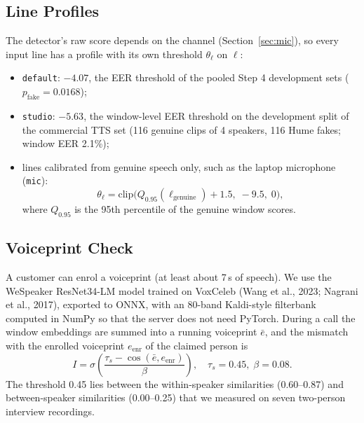 \documentclass[10pt,a4paper,twocolumn]{article}
\newcommand{\llr}{\ell}
\begin{document}
\subsection{Line Profiles}
\label{sec:profiles}
The detector's raw score depends on the channel (Section~\ref{sec:mic}), so every input line has a profile with its own threshold $\theta_{\ell}$ on $\llr$:
\begin{itemize}\setlength\itemsep{0pt}
\item \texttt{default}: $-4.07$, the EER threshold of the pooled Step 4 development sets ($p_{\text{fake}}=0.0168$);
\item \texttt{studio}: $-5.63$, the window-level EER threshold on the development split of the commercial TTS set (116 genuine clips of 4 speakers, 116 Hume fakes; window EER 2.1\%);
\item lines calibrated from genuine speech only, such as the laptop microphone (\texttt{mic}):
\begin{equation}
\theta_{\ell}=\mathrm{clip}\big(Q_{0.95}(\llr_{\text{genuine}})+1.5,\;-9.5,\;0\big),
\label{eq:calib}
\end{equation}
where $Q_{0.95}$ is the 95th percentile of the genuine window scores.
\end{itemize}

\subsection{Voiceprint Check}
A customer can enrol a voiceprint (at least about 7\,s of speech). We use the WeSpeaker ResNet34-LM model trained on VoxCeleb (Wang et al., 2023; Nagrani et al., 2017), exported to ONNX, with an 80-band Kaldi-style filterbank computed in NumPy so that the server does not need PyTorch. During a call the window embeddings are summed into a running voiceprint $\bar e$, and the mismatch with the enrolled voiceprint $e_{\text{enr}}$ of the claimed person is
\begin{equation}
I=\sigma\!\left(\frac{\tau_s-\cos(\bar e,e_{\text{enr}})}{\beta}\right),\quad \tau_s=0.45,\;\beta=0.08 .
\label{eq:spk}
\end{equation}
The threshold 0.45 lies between the within-speaker similarities (0.60--0.87) and between-speaker similarities (0.00--0.25) that we measured on seven two-person interview recordings.
\end{document}
